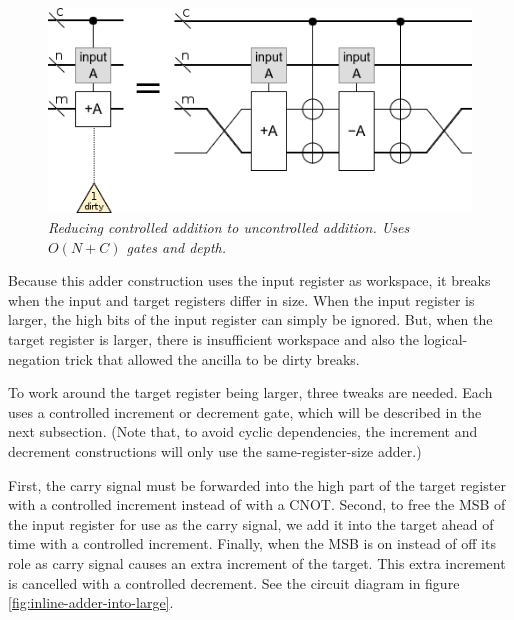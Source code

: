 \documentclass[twocolumn]{article}
\begin{document}
\begin{figure}
  \centering
  \includegraphics[width=\linewidth]{assets/controlled-addition.png}
  \caption{\em
  	Reducing controlled addition to uncontrolled addition.
  	Uses $O(N + C)$ gates and depth.
  }
  \label{fig:controlled-addition}
\end{figure}

Because this adder construction uses the input register as workspace, it breaks when the input and target registers differ in size.
When the input register is larger, the high bits of the input register can simply be ignored.
But, when the target register is larger, there is insufficient workspace and also the logical-negation trick that allowed the ancilla to be dirty breaks.

To work around the target register being larger, three tweaks are needed.
Each uses a controlled increment or decrement gate, which will be described in the next subsection.
(Note that, to avoid cyclic dependencies, the increment and decrement constructions will only use the same-register-size adder.)

First, the carry signal must be forwarded into the high part of the target register with a controlled increment instead of with a CNOT.
Second, to free the MSB of the input register for use as the carry signal, we add it into the target ahead of time with a controlled increment.
Finally, when the MSB is on instead of off its role as carry signal causes an extra increment of the target.
This extra increment is cancelled with a controlled decrement.
See the circuit diagram in figure \ref{fig:inline-adder-into-large}.
\end{document}
